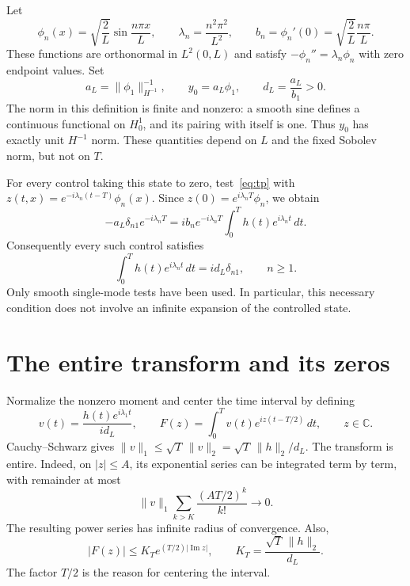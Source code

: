 \documentclass[11pt]{article}
\begin{document}
Let
\begin{equation}\label{eq:spectrum}
 \phi_n(x)=\sqrt{\frac2L}\sin\frac{n\pi x}{L},\qquad
 \lambda_n=\frac{n^2\pi^2}{L^2},\qquad
 b_n=\phi_n'(0)=\sqrt{\frac2L}\frac{n\pi}{L}.
\end{equation}
These functions are orthonormal in $L^2(0,L)$ and satisfy
$-\phi_n''=\lambda_n\phi_n$ with zero endpoint values. Set
\begin{equation}\label{eq:witness}
 a_L=\|\phi_1\|_{H^{-1}}^{-1},\qquad
 y_0=a_L\phi_1,\qquad d_L=\frac{a_L}{b_1}>0.
\end{equation}
The norm in this definition is finite and nonzero: a smooth sine defines a
continuous functional on $H_0^1$, and its pairing with itself is one.
Thus $y_0$ has exactly unit $H^{-1}$ norm. These quantities depend on $L$
and the fixed Sobolev norm, but not on $T$.

For every control taking this state to zero, test~\eqref{eq:tp} with
$z(t,x)=e^{-i\lambda_n(t-T)}\phi_n(x)$. Since
$z(0)=e^{i\lambda_nT}\phi_n$, we obtain
\[
 -a_L\delta_{n1}e^{-i\lambda_nT}
 =i b_n e^{-i\lambda_nT}\int_0^T h(t)e^{i\lambda_n t}\,dt.
\]
Consequently every such control satisfies
\begin{equation}\label{eq:moments}
 \int_0^T h(t)e^{i\lambda_n t}\,dt=i d_L\delta_{n1},\qquad n\ge1.
\end{equation}
Only smooth single-mode tests have been used. In particular, this necessary
condition does not involve an infinite expansion of the controlled state.

\section{The entire transform and its zeros}\label{sec:jensen}
Normalize the nonzero moment and center the time interval by defining
\begin{equation}\label{eq:transform}
 v(t)=\frac{h(t)e^{i\lambda_1t}}{i d_L},\qquad
 F(z)=\int_0^T v(t)e^{iz(t-T/2)}\,dt,\qquad z\in\mathbb C.
\end{equation}
Cauchy--Schwarz gives $\|v\|_1\le\sqrt T\,\|v\|_2
=\sqrt T\,\|h\|_2/d_L$. The transform is entire. Indeed, on $|z|\le A$,
its exponential series can be integrated term by term, with remainder at
most
\[
 \|v\|_1\sum_{k>K}\frac{(AT/2)^k}{k!}\longrightarrow0.
\]
The resulting power series has infinite radius of convergence. Also,
\begin{equation}\label{eq:growth}
 |F(z)|\le K_T e^{(T/2)|\operatorname{Im}z|},\qquad
 K_T=\frac{\sqrt T\,\|h\|_2}{d_L}.
\end{equation}
The factor $T/2$ is the reason for centering the interval.
\end{document}
